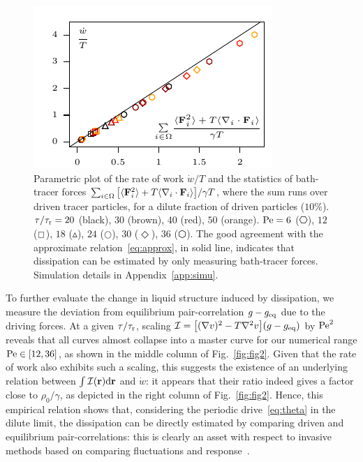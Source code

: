 \documentclass[pre, superscriptaddress, twocolumn,pre]{revtex4-1}
\begin{document}
\begin{figure}
	\centering
	\includegraphics[width=\linewidth]{fig1.pdf}
	\caption{\label{fig:fig1}
		Parametric plot of the rate of work $\dot w/T$ and the statistics of bath-tracer forces $\sum_{i\in\Omega}\big[\langle{\bf F}_i^2\rangle + T\langle\nabla_i\cdot{\bf F}_i\rangle\big]/\gamma T$, where the sum runs over driven tracer particles, for a dilute fraction of driven particles ($10\%$). $\tau/\tau_{\rm r}=20$ (black), $30$ (brown), $40$ (red), $50$ (orange). ${\rm Pe}=6$ ($\hexagon$), $12$ ($\boxempty$), $18$ ({\large$\vartriangle$}), $24$ ({$\Circle$}), $30$ (${\Diamond}$), $36$ ($\varhexagon$). The good agreement with the approximate relation~\eqref{eq:approx}, in solid line, indicates that dissipation can be estimated by only measuring bath-tracer forces.
		Simulation details in Appendix~\ref{app:simu}.
	}
\end{figure}


To further evaluate the change in liquid structure induced by dissipation, we measure the deviation from equilibrium pair-correlation $g-g_{\rm eq}$ due to the driving forces. At a given $\tau/\tau_{\rm r}$, scaling ${\cal I} = \big[(\nabla v)^2-T\nabla^2v\big](g - g_{\rm eq})$ by ${\rm Pe}^2$ reveals that all curves almost collapse into a master curve for our numerical range ${\rm Pe}\in[12,36]$, as shown in the middle column of Fig.~\ref{fig:fig2}. Given that the rate of work also exhibits such a scaling, this suggests the existence of an underlying relation between $\int{\cal I}({\bf r}){\rm d}{\bf r}$ and $\dot w$: it appears that their ratio indeed gives a factor close to $\rho_0/\gamma$, as depicted in the right column of Fig.~\ref{fig:fig2}. Hence, this empirical relation shows that, considering the periodic drive~\eqref{eq:theta} in the dilute limit, the dissipation can be directly estimated by comparing driven and equilibrium pair-correlations: this is clearly an asset with respect to invasive methods based on comparing fluctuations and response~\cite{Harada2005, Mizuno2007, Visco2015, Turlier2016, Ahmed2018}.
\end{document}
